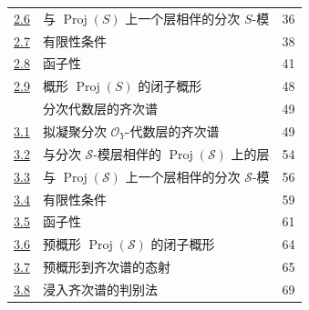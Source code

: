 \documentclass[UTF8,fontset=none,11pt,oneside,openany]{ctexbook}
\providecommand{\Proj}{\operatorname{Proj}}
\newcommand{\oldpage}[2][]{%
  \hypertarget{ega-source-page-#1-#2}{}%
  \marginnote{\scriptsize\textbf{#1}~|~#2}\ignorespaces}
\begin{document}
\begin{longtable}{@{}p{}p{}r@{}}
\hyperref[subsection:II.2.6-zh]{2.6} & 与 $\Proj(S)$ 上一个层相伴的分次 $S$-模 & 36\\
\hyperref[subsection:II.2.7-zh]{2.7} & 有限性条件 & 38\\
\hyperref[subsection:II.2.8-zh]{2.8} & 函子性 & 41\\
\hyperref[subsection:II.2.9-zh]{2.9} & 概形 $\Proj(S)$ 的闭子概形 & 48\\
\hyperref[section:II.3-zh]{\textsection3} & 分次代数层的齐次谱 & 49\\
\hyperref[subsection:II.3.1-zh]{3.1} & 拟凝聚分次 $\mathcal{O}_Y$-代数层的齐次谱 & 49\\
\hyperref[subsection:II.3.2-zh]{3.2} & 与分次 $\mathcal{S}$-模层相伴的 $\Proj(\mathcal{S})$ 上的层 & 54\\
\hyperref[subsection:II.3.3-zh]{3.3} & 与 $\Proj(\mathcal{S})$ 上一个层相伴的分次 $\mathcal{S}$-模 & 56\\
\hyperref[subsection:II.3.4-zh]{3.4} & 有限性条件 & 59\\
\hyperref[subsection:II.3.5-zh]{3.5} & 函子性 & 61\\
\hyperref[subsection:II.3.6-zh]{3.6} & 预概形 $\Proj(\mathcal{S})$ 的闭子概形 & 64\\
\hyperref[subsection:II.3.7-zh]{3.7} & 预概形到齐次谱的态射 & 65\\
\hyperref[subsection:II.3.8-zh]{3.8} & 浸入齐次谱的判别法 & 69\\
\end{longtable}
\oldpage[II]{214}
\end{document}
